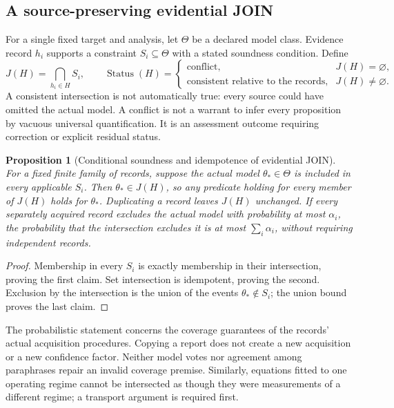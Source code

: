 \documentclass[11pt,a4paper]{article}
\newtheorem{proposition}[theorem]{Proposition}
\theoremstyle{definition}
\theoremstyle{remark}
\begin{document}
\subsection{A source-preserving evidential JOIN}
For a single fixed target and analysis, let $\Theta$ be a declared model class. Evidence record $h_i$ supports a constraint $S_i\subseteq\Theta$ with a stated soundness condition. Define
\begin{equation}\label{eq:evidencejoin}
 J(H)=\bigcap_{h_i\in H}S_i,\qquad
 \operatorname{Status}(H)=
 \begin{cases}
 \text{conflict},&J(H)=\varnothing,\\
 \text{consistent relative to the records},&J(H)\ne\varnothing.
 \end{cases}
\end{equation}
A consistent intersection is not automatically true: every source could have omitted the actual model. A conflict is not a warrant to infer every proposition by vacuous universal quantification. It is an assessment outcome requiring correction or explicit residual status.

\begin{proposition}[Conditional soundness and idempotence of evidential JOIN]\label{prop:join}
For a fixed finite family of records, suppose the actual model $\theta_*\in\Theta$ is included in every applicable $S_i$. Then $\theta_*\in J(H)$, so any predicate holding for every member of $J(H)$ holds for $\theta_*$. Duplicating a record leaves $J(H)$ unchanged. If every separately acquired record excludes the actual model with probability at most $\alpha_i$, the probability that the intersection excludes it is at most $\sum_i\alpha_i$, without requiring independent records.
\end{proposition}
\begin{proof}
Membership in every $S_i$ is exactly membership in their intersection, proving the first claim. Set intersection is idempotent, proving the second. Exclusion by the intersection is the union of the events $\theta_*\notin S_i$; the union bound proves the last claim.
\end{proof}

The probabilistic statement concerns the coverage guarantees of the records' actual acquisition procedures. Copying a report does not create a new acquisition or a new confidence factor. Neither model votes nor agreement among paraphrases repair an invalid coverage premise. Similarly, equations fitted to one operating regime cannot be intersected as though they were measurements of a different regime; a transport argument is required first.
\end{document}
